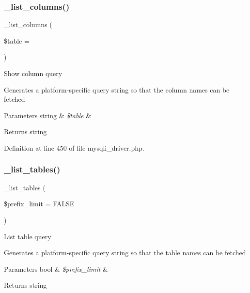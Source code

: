 \subsubsection{\texorpdfstring{\_list\_columns()}{\_list\_columns()}}
{\footnotesize\ttfamily \+\_\+list\+\_\+columns (\begin{DoxyParamCaption}\item[{}]{\$table = {\ttfamily \textquotesingle{}\textquotesingle{}} }\end{DoxyParamCaption})\hspace{0.3cm}{\ttfamily [protected]}}

Show column query

Generates a platform-\/specific query string so that the column names can be fetched


\begin{DoxyParams}[1]{Parameters}
string & {\em \$table} & \\
\hline
\end{DoxyParams}
\begin{DoxyReturn}{Returns}
string 
\end{DoxyReturn}


Definition at line 450 of file mysqli\+\_\+driver.\+php.

\mbox{\label{class_c_i___d_b__mysqli__driver_a435c0f3ce54fe7daa178baa8532ebd54}} 
\subsubsection{\texorpdfstring{\_list\_tables()}{\_list\_tables()}}
{\footnotesize\ttfamily \+\_\+list\+\_\+tables (\begin{DoxyParamCaption}\item[{}]{\$prefix\+\_\+limit = {\ttfamily FALSE} }\end{DoxyParamCaption})\hspace{0.3cm}{\ttfamily [protected]}}

List table query

Generates a platform-\/specific query string so that the table names can be fetched


\begin{DoxyParams}[1]{Parameters}
bool & {\em \$prefix\+\_\+limit} & \\
\hline
\end{DoxyParams}
\begin{DoxyReturn}{Returns}
string 
\end{DoxyReturn}


